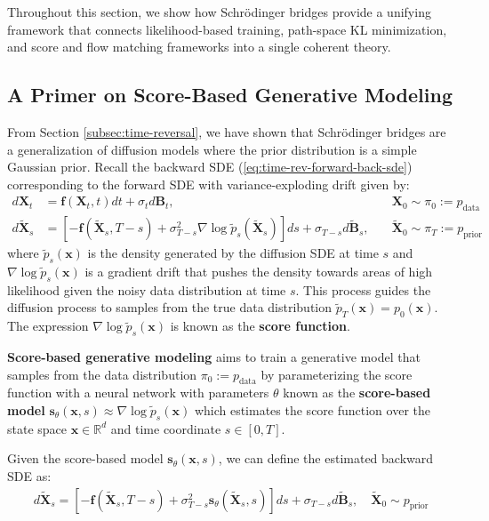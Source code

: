 \documentclass{article}
\newcommand{\boldtext}[1]{\textbf{\textcolor{MyGreen}{#1}}}
\begin{document}
Throughout this section, we show how Schrödinger bridges provide a unifying framework that connects likelihood-based training, path-space KL minimization, and score and flow matching frameworks into a single coherent theory.

\subsection{A Primer on Score-Based Generative Modeling}
\label{subsec:primer-sgm}
From Section \ref{subsec:time-reversal}, we have shown that Schrödinger bridges are a generalization of diffusion models where the prior distribution is a simple Gaussian prior. Recall the backward SDE (\ref{eq:time-rev-forward-back-sde}) corresponding to the forward SDE with variance-exploding drift given by:
\begin{align}
    d\boldsymbol{X}_t&=\boldsymbol{f}(\boldsymbol{X}_t, t)dt+\sigma_td\boldsymbol{B}_t, \quad &\boldsymbol{X}_0\sim \pi_0:=p_{\text{data}}\\
    d\tilde{\boldsymbol{X}}_s&=\left[-\boldsymbol{f}(\tilde{\boldsymbol{X}}_s,T-s)+\sigma_{T-s}^2\nabla\log \tilde{p}_s(\tilde{\boldsymbol{X}}_s)\right]ds+\sigma_{T-s}d\widetilde{\boldsymbol{B}}_s, \quad &\tilde{\boldsymbol{X}}_0\sim \pi _T:=p_{\text{prior}}
\end{align}
where $\tilde{p}_s(\boldsymbol{x})$ is the density generated by the diffusion SDE at time $s$ and $\nabla\log \tilde{p}_s(\boldsymbol{x})$ is a gradient drift that pushes the density towards areas of high likelihood given the noisy data distribution at time $s$. This process guides the diffusion process to samples from the true data distribution $\tilde{p}_T(\boldsymbol{x})=p_0(\boldsymbol{x})$. The expression $\nabla \log \tilde{p}_s(\boldsymbol{x})$ is known as the \textbf{score function}.

\boldtext{Score-based generative modeling} aims to train a generative model that samples from the data distribution $\pi_0:=p_{\text{data}}$ by parameterizing the score function with a neural network with parameters $\theta$ known as the \textbf{score-based model} $\boldsymbol{s}_\theta(\boldsymbol{x},s)\approx \nabla \log \tilde{p}_s(\boldsymbol{x})$ which estimates the score function over the state space $\boldsymbol{x}\in \mathbb{R}^d$ and time coordinate $s\in [0,T]$. 

Given the score-based model $\boldsymbol{s}_\theta(\boldsymbol{x},s)$, we can define the estimated backward SDE as:
\begin{align}
    d\tilde{\boldsymbol{X}}_s=\left[-\boldsymbol{f}(\tilde{\boldsymbol{X}}_s,T-s)+\sigma_{T-s}^2\boldsymbol{s}_\theta(\tilde{\boldsymbol{X}}_s, s)\right]ds+\sigma_{T-s}d\widetilde{\boldsymbol{B}}_s, \quad \tilde{\boldsymbol{X}}_0\sim p_{\text{prior}}\label{eq:score-sde}
\end{align}
\end{document}
